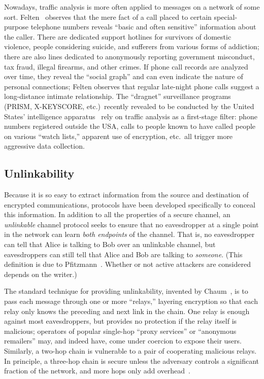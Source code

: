\documentclass[oneside]{zarticle}
\begin{document}
\begin{multicols}{2}
Nowadays, traffic analysis is more often applied to messages on a
network of some sort.  Felten~\cite{felten2013decl} observes that the
mere fact of a call placed to certain special-purpose telephone
numbers reveals “basic and often sensitive” information about the
caller.  There are dedicated support hotlines for survivors of
domestic violence, people considering suicide, and sufferers from
various forms of addiction; there are also lines dedicated to
anonymously reporting government misconduct, tax fraud, illegal
firearms, and other crimes.  If phone call records are analyzed over
time, they reveal the “social graph” and can even indicate the nature
of personal connections; Felten observes that regular late-night phone
calls suggest a long-distance intimate relationship.  The “dragnet”
surveillance programs (PRISM, X-KEYSCORE, etc.)\ recently revealed to
be conducted by the United States' intelligence
apparatus~\cite{greenwald2013nsa} rely on traffic analysis as a
first-stage filter: phone numbers registered outside the USA, calls to
people known to have called people on various “watch lists,” apparent
use of encryption, etc.\ all trigger more aggressive data collection.

\subsection{Unlinkability}

Because it is so easy to extract information from the source and
destination of encrypted communications, protocols have been developed
specifically to conceal this information.  In addition to all the
properties of a secure channel, an \emph{unlinkable} channel protocol
seeks to ensure that no eavesdropper at a single point in the network
can learn \emph{both endpoints} of the channel.  That is, no
eavesdropper can tell that Alice is talking to Bob over an unlinkable
channel, but eavesdroppers can still tell that Alice and Bob are
talking to \emph{someone}.  (This definition is due to
Pfitzmann~\cite{pfitzmann2010terminology}.  Whether or not active
attackers are considered depends on the writer.)

The standard technique for providing unlinkability, invented by
Chaum~\cite{chaum1981mix}, is to pass each message through one or more
“relays,” layering encryption so that each relay only knows the
preceding and next link in the chain. One relay is enough against most
eavesdroppers, but provides no protection if the relay itself is
malicious; operators of popular single-hop “proxy services” or
“anonymous remailers” may, and indeed have, come under coercion to
expose their users.~\cite{newman1996church,
  singel2007hushmail,ackerman2013lavabit} Similarly, a two-hop chain
is vulnerable to a pair of cooperating malicious relays.  In
principle, a three-hop chain is secure unless the adversary controls a
significant fraction of the network, and more hops only add
overhead~\cite{wright2002analysis, wright2003defending}.


\end{multicols}
\end{document}
